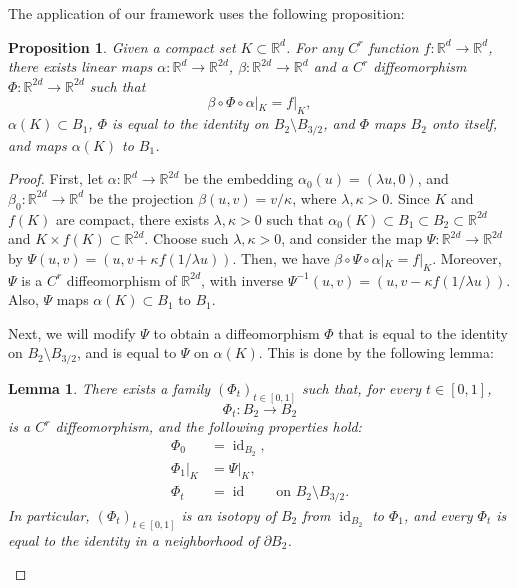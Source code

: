 \documentclass[12pt]{amsart}
\numberwithin{equation}{section}
\newtheorem{proposition}{Proposition}[section]
\newtheorem{lemma}{Lemma}[section]
\theoremstyle{remark}
\begin{document}
The application of our framework uses the following proposition:
\begin{proposition}
    \label{prop:lift_projection}
    Given a compact set $K\subset \mathbb R^d$. For any $C^r$ function $f:\mathbb R^d\to \mathbb R^d$, there exists linear maps $\alpha: \mathbb R^d\to \mathbb R^{2d}$, $\beta: \mathbb R^{2d}\to \mathbb R^d$ and a $C^r$ diffeomorphism $\Phi:\mathbb R^{2d}\to \mathbb R^{2d}$ such that
    \begin{equation}
        \beta\circ \Phi \circ \alpha|_K = f|_K,
    \end{equation}
    $\alpha(K)\subset B_1$,  $\Phi$ is equal to the identity on $B_2\setminus B_{3/2}$, and $\Phi$ maps $B_2$ onto itself, and maps $\alpha(K)$ to $B_1$.
\end{proposition}
\begin{proof}
First, let $\alpha:\mathbb R^d\to \mathbb R^{2d}$ be the embedding $\alpha_0(u)=(\lambda u,0)$, and $\beta_0:\mathbb R^{2d}\to \mathbb R^d$ be the projection $\beta(u,v)=v/\kappa$, where $\lambda, \kappa>0$. Since $K$ and $f(K)$ are compact, there exists $\lambda, \kappa>0$ such that $\alpha_0(K)\subset B_1\subset B_2\subset \mathbb R^{2d}$ and $K\times f(K)\subset \mathbb R^{2d}$. 
Choose such $\lambda, \kappa>0$, and consider the map
$\Psi:\mathbb R^{2d}\to \mathbb R^{2d}$ by $\Psi(u,v)=(u,v+\kappa f(1/\lambda u))$. Then, we have $\beta\circ \Psi \circ \alpha|_K = f|_K$. 
Moreover, $\Psi$ is a $C^r$ diffeomorphism of $\mathbb R^{2d}$, with inverse $\Psi^{-1}(u,v)=(u,v-\kappa f(1/\lambda u))$. Also, $\Psi$ maps $\alpha(K)\subset B_1$ to $B_1$.

Next, we will modify $\Psi$ to obtain a diffeomorphism $\Phi$ that is equal to the identity on $B_2\setminus B_{3/2}$, and is equal to $\Psi$ on $\alpha(K)$. This is done by the following lemma:

\begin{lemma}
    \label{lemma:extension}
There exists a family $(\Phi_t)_{t\in[0,1]}$ such that, for every $t\in[0,1]$,
\begin{equation}
\Phi_t:B_2\to B_2
\end{equation}
is a $C^r$ diffeomorphism, and the following properties hold:
\begin{align*}
\Phi_0 &= \operatorname{id}_{B_2},\\
\Phi_1|_K &= \Psi|_K,\\
\Phi_t &= \operatorname{id}
\qquad \text{on } B_2\setminus B_{3/2}.
\end{align*}
In particular, $(\Phi_t)_{t\in[0,1]}$ is an isotopy of $B_2$ from $\operatorname{id}_{B_2}$ to $\Phi_1$, and every $\Phi_t$ is equal to the identity in a neighborhood of $\partial B_2$.
\end{lemma}


\end{proof}
\end{document}
